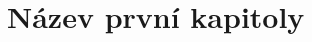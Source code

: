 


\def\documentdate{7. července 2017}

\pagestyle{empty}

%

\cleardoublepage




\cleardoublepage

%

\cleardoublepage

%

\cleardoublepage

\pagestyle{plain}


%

\pagestyle{headings}

\chapter{Název první kapitoly}

\pagestyle{plain}

%

\nocite{*}


